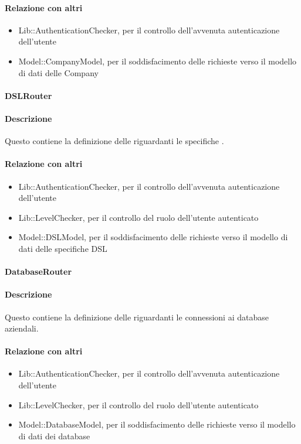 \paragraph*{Relazione con altri }
\begin{itemize}
\item Lib::AuthenticationChecker, per il controllo dell'avvenuta autenticazione dell'utente
\item Model::CompanyModel, per il soddisfacimento delle richieste verso il modello di dati delle Company
\end{itemize}

\paragraph{DSLRouter}
\paragraph*{Descrizione}
Questo  contiene la definizione delle  riguardanti le specifiche .

\paragraph*{Relazione con altri }
\begin{itemize}
\item Lib::AuthenticationChecker, per il controllo dell'avvenuta autenticazione dell'utente
\item Lib::LevelChecker, per il controllo del ruolo dell'utente autenticato
\item Model::DSLModel, per il soddisfacimento delle richieste verso il modello di dati delle specifiche DSL
\end{itemize}

\paragraph{DatabaseRouter}
\paragraph*{Descrizione}
Questo  contiene la definizione delle  riguardanti le connessioni ai database aziendali.

\paragraph*{Relazione con altri }
\begin{itemize}
\item Lib::AuthenticationChecker, per il controllo dell'avvenuta autenticazione dell'utente
\item Lib::LevelChecker, per il controllo del ruolo dell'utente autenticato
\item Model::DatabaseModel, per il soddisfacimento delle richieste verso il modello di dati dei database
\end{itemize}

